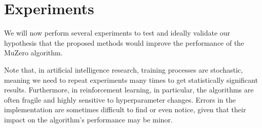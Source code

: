 \section{Experiments}
We will now perform several experiments to test and ideally validate our hypothesis that the proposed methods would improve the performance of the MuZero algorithm.

Note that, in artificial intelligence research, training processes are stochastic, meaning we need to repeat experiments many times to get statistically significant results. Furthermore, in reinforcement learning, in particular, the algorithms are often fragile and highly sensitive to hyperparameter changes. Errors in the implementation are sometimes difficult to find or even notice, given that their impact on the algorithm's performance may be minor.





